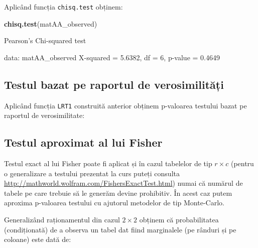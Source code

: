 \documentclass[]{article}
\newenvironment{Shaded}{\begin{snugshade}}{\end{snugshade}}
\newcommand{\KeywordTok}[1]{\textcolor[rgb]{0.13,0.29,0.53}{\textbf{#1}}}
\newcommand{\DecValTok}[1]{\textcolor[rgb]{0.00,0.00,0.81}{#1}}
\newcommand{\FloatTok}[1]{\textcolor[rgb]{0.00,0.00,0.81}{#1}}
\newcommand{\StringTok}[1]{\textcolor[rgb]{0.31,0.60,0.02}{#1}}
\newcommand{\OperatorTok}[1]{\textcolor[rgb]{0.81,0.36,0.00}{\textbf{#1}}}
\newcommand{\NormalTok}[1]{#1}
\begin{document}

Aplicând funcția \texttt{chisq.test} obținem:

\begin{Shaded}
\begin{Highlighting}[]
\KeywordTok{chisq.test}\NormalTok{(matAA_observed)}

\NormalTok{    Pearson}\StringTok{'s Chi-squared test}

\StringTok{data:  matAA_observed}
\StringTok{X-squared = 5.6382, df = 6, p-value = 0.4649}
\end{Highlighting}
\end{Shaded}

\subsection{Testul bazat pe raportul de
verosimilități}\label{testul-bazat-pe-raportul-de-verosimilitati}

Aplicând funcția \texttt{LRT1} construită anterior obținem p-valoarea
testului bazat pe raportul de verosimilitate:

\begin{Shaded}
\end{Shaded}

\subsection{Testul aproximat al lui
Fisher}\label{testul-aproximat-al-lui-fisher}

Testul exact al lui Fisher poate fi aplicat și în cazul tabelelor de tip
\(r\times c\) (pentru o generalizare a testului prezentat la curs puteți
consulta \url{http://mathworld.wolfram.com/FishersExactTest.html}) numai
că numărul de tabele pe care trebuie să le generăm devine prohibitiv. În
acest caz putem aproxima p-valoarea testului cu ajutorul metodelor de
tip Monte-Carlo.

Generalizând raționamentul din cazul \(2 \times 2\) obținem că
probabilitatea (condiționată) de a observa un tabel dat fiind
marginalele (pe rânduri și pe coloane) este dată de:
\end{document}
